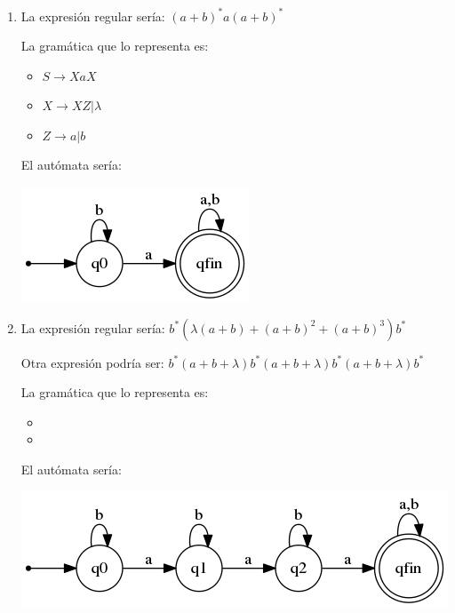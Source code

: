 \begin{problem}
\begin{enumerate}
\item 
La expresión regular sería: $(a+b)^* a (a+b)^* $

La gramática que lo representa es:
\begin{itemize}
\item $S \rightarrow XaX$
\item $X \rightarrow XZ | \lambda$
\item $Z \rightarrow a | b$
\end{itemize}

El autómata sería:
\begin{center}
\includegraphics[scale=0.75]{tex/automata2.png}
\end{center}

\item 
La expresión regular sería: $b^* (\lambda (a+b) + (a+b)^2 + (a+b)^3) b^*$

Otra expresión podría ser: $b^*(a+b+\lambda)b^*(a+b+\lambda)b^*(a+b+\lambda) b^*$

La gramática que lo representa es:
\begin{itemize}
\item
\item
\end{itemize}

El autómata sería:
\begin{center}
\includegraphics[scale=0.75]{tex/automata3.png}
\end{center}

\end{enumerate}
\end{problem}


